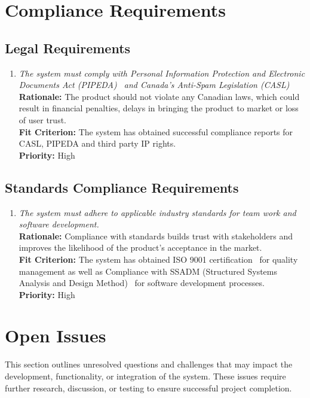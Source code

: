 \documentclass[12pt]{article}
\begin{document}
\section{Compliance Requirements}
\subsection{Legal Requirements}
\begin{enumerate}[label=CR-LR \arabic*., wide=0pt, leftmargin=*]
    \item \emph{The system must comply with Personal Information Protection and Electronic Documents Act (PIPEDA)~\citep{PIPEDA2024} and Canada’s Anti-Spam Legislation (CASL)~\citep{CASL2024}}\\[2mm]
    {\bf Rationale:} The product should not violate any Canadian laws, which could result in  financial penalties, delays in bringing the product to market or loss of user trust.\\
    {\bf Fit Criterion:} The system has obtained successful compliance reports for CASL, PIPEDA and third party IP rights.\\
    {\bf Priority:} High
\end{enumerate}
\subsection{Standards Compliance Requirements}
\begin{enumerate}[label=CR-SCR \arabic*., wide=0pt, leftmargin=*]
	\item \emph{The system must adhere to applicable industry standards for team work and software development.}\\[2mm]
    {\bf Rationale:} Compliance with standards builds trust with stakeholders and improves the likelihood of the product’s acceptance in the market.\\
    {\bf Fit Criterion:} The system has obtained ISO 9001 certification~\citep{ISO9001} for quality management as well as Compliance with SSADM (Structured Systems Analysis and Design Method)~\citep{SSADM2024} for software development processes.\\
    {\bf Priority:} High
\end{enumerate}

\section{Open Issues}

This section outlines unresolved questions and challenges that may impact the development, functionality, or integration of the system. These issues require further research, discussion, or testing to ensure successful project completion.\\
\end{document}
